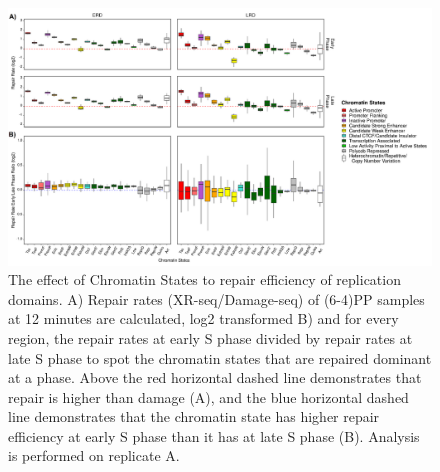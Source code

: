 \begin{figure}[H]
\begin{center}
\includegraphics[width=\textwidth]{Chapters/7_appendix/figures/supfig13}
\caption[The effect of Chromatin States to repair efficiency of replication domains for (6-4)PP samples at 12 minutes (replicate A).]{The effect of Chromatin States to repair efficiency of replication domains. A) Repair rates (XR-seq/Damage-seq) of (6-4)PP samples at 12 minutes are calculated, log2 transformed B) and for every region, the repair rates at early S phase divided by repair rates at late S phase to spot the chromatin states that are repaired dominant at a phase. Above the red horizontal dashed line demonstrates that repair is higher than damage (A), and the blue horizontal dashed line demonstrates that the chromatin state has higher repair efficiency at early S phase than it has at late S phase (B). Analysis is performed on replicate A.}
\label{supfig:chromatin1}
\end{center}
\end{figure}

